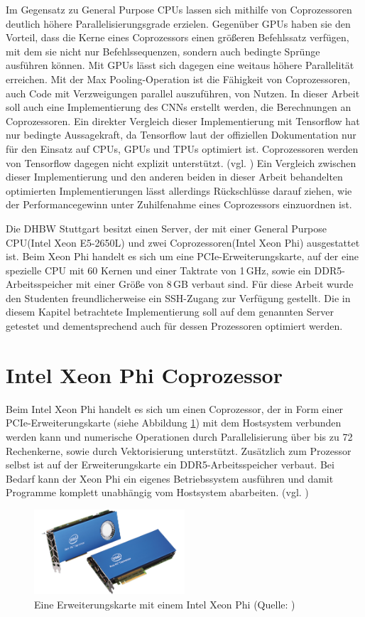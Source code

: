 \documentclass[../main.tex]{subfiles}
\begin{document}
Im Gegensatz zu General Purpose CPUs lassen sich mithilfe von Coprozessoren deutlich höhere Parallelisierungsgrade erzielen. Gegenüber GPUs haben sie den Vorteil, dass die Kerne eines Coprozessors einen größeren Befehlssatz verfügen, mit dem sie nicht nur Befehlssequenzen, sondern auch bedingte Sprünge ausführen können. Mit GPUs lässt sich dagegen eine weitaus höhere Parallelität erreichen. Mit der Max Pooling-Operation ist die Fähigkeit von Coprozessoren, auch Code mit Verzweigungen parallel auszuführen, von Nutzen. 
In dieser Arbeit soll auch eine Implementierung des CNNs erstellt werden, die Berechnungen an Coprozessoren. Ein direkter Vergleich dieser Implementierung mit Tensorflow hat nur bedingte Aussagekraft, da Tensorflow laut der offiziellen Dokumentation nur für den Einsatz auf CPUs, GPUs und TPUs optimiert ist. Coprozessoren werden von Tensorflow dagegen nicht explizit unterstützt. (vgl. \cite{aboutTensorflow}) Ein Vergleich zwischen dieser Implementierung und den anderen beiden in dieser Arbeit behandelten optimierten Implementierungen lässt allerdings Rückschlüsse darauf ziehen, wie der Performancegewinn unter Zuhilfenahme eines Coprozessors einzuordnen ist. 

Die DHBW Stuttgart besitzt einen Server, der mit einer General Purpose CPU(Intel Xeon E5-2650L) und zwei Coprozessoren(Intel Xeon Phi) ausgestattet ist. Beim Xeon Phi handelt es sich um eine PCIe-Erweiterungskarte, auf der eine spezielle CPU mit 60 Kernen und einer Taktrate von 1\,GHz, sowie ein DDR5-Arbeitsspeicher mit einer Größe von 8\,GB verbaut sind. Für diese Arbeit wurde den Studenten freundlicherweise ein SSH-Zugang zur Verfügung gestellt. Die in diesem Kapitel betrachtete Implementierung soll auf dem genannten Server getestet und dementsprechend auch für dessen Prozessoren optimiert werden. 
\section{Intel Xeon Phi Coprozessor}
Beim Intel Xeon Phi handelt es sich um einen Coprozessor, der in Form einer PCIe-Erweiterungskarte (siehe Abbildung \ref{pic:xeonphicard}) mit dem Hostsystem verbunden werden kann und numerische Operationen durch Parallelisierung über bis zu 72 Rechenkerne, sowie durch Vektorisierung unterstützt. Zusätzlich zum Prozessor selbst ist auf der Erweiterungskarte ein DDR5-Arbeitsspeicher verbaut. Bei Bedarf kann der Xeon Phi ein eigenes Betriebssystem ausführen und damit Programme komplett unabhängig vom Hostsystem abarbeiten. (vgl. \cite{intelxeonphiprocessors})
\begin{figure}
    \centering 
       \includegraphics[width=0.5\textwidth]{../images/Schmidt/xeon_phi_cards.png} 
    \caption {Eine Erweiterungskarte mit einem Intel Xeon Phi (Quelle: \parencite{intelMICarchitecture})} 
    \label{pic:xeonphicard} 
\end{figure} 
\end{document}
